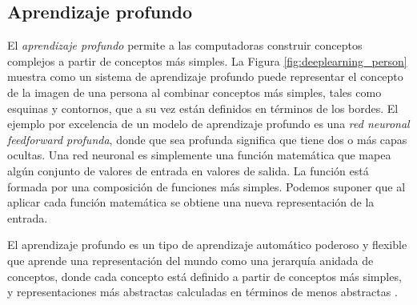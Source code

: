 


\subsection{Aprendizaje profundo}
El \textit{aprendizaje profundo} permite a las computadoras construir conceptos complejos
a partir de conceptos más simples. La Figura 
\ref{fig:deeplearning_person} muestra como un sistema de aprendizaje profundo
puede representar el concepto de la imagen de una persona al combinar conceptos más simples, tales
como esquinas y contornos, que a su vez están definidos en términos de los bordes.
El ejemplo por excelencia de un modelo de aprendizaje profundo es una \textit{red neuronal feedforward
profunda}, donde que sea profunda significa que tiene dos o más capas ocultas. Una red neuronal
es simplemente una función matemática que mapea algún conjunto de valores de entrada en 
valores de salida. La función está formada por una composición de funciones más simples.
Podemos suponer que al aplicar cada función matemática se obtiene una nueva representación de la
entrada.\\

\begin{remark}

El aprendizaje profundo es un tipo de aprendizaje automático
poderoso y flexible que aprende una representación del mundo
como una jerarquía anidada de conceptos, donde 
cada concepto está definido a partir de conceptos más simples,
y representaciones más abstractas calculadas en términos
de menos abstractas \cite{iangoodfellowyoshuabengioaaroncourville2017}.

\end{remark}


